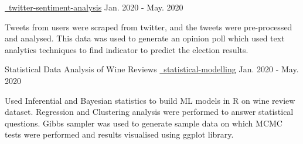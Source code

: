 \begin{cventries}
    {
    {}
    {\href{https://github.com/mukeshmk/twitter-sentiment-analysis}{\faGithubSquare\ twitter-sentiment-analysis}}
    }
    {Jan. 2020 - May. 2020}
    {
      \begin{cvitems}
      \vspace{-0.5ex}
      Tweets from users were scraped from twitter, and the tweets were pre-processed and analysed. This data was used to generate an opinion poll which used text analytics techniques to find indicator to predict the election results.
      \end{cvitems}
    }
  \cvproject
    {Statistical Data Analysis of Wine Reviews}
    {
    {}
    {\href{https://github.com/mukeshmk/statistical-modelling}{\faGithubSquare\ statistical-modelling}}
    }
    {Jan. 2020 - May. 2020}
    {
      \begin{cvitems}
      \vspace{-0.5ex}
        Used Inferential and Bayesian statistics to build ML models in R on wine review dataset. Regression and Clustering analysis were performed to answer statistical questions. Gibbs sampler was used to generate sample data on which MCMC tests were performed and results visualised using ggplot library.
      \end{cvitems}
    }

\end{cventries}
